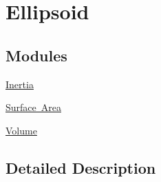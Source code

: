 \hypertarget{group___e_g_x_math-_geometry-3_d-_ellipsoid}{}\section{Ellipsoid}
\label{group___e_g_x_math-_geometry-3_d-_ellipsoid}
\subsection*{Modules}
\begin{DoxyCompactItemize}
\item 
\mbox{\hyperlink{group___e_g_x_math-_geometry-3_d-_ellipsoid-_inertia}{Inertia}}
\item 
\mbox{\hyperlink{group___e_g_x_math-_geometry-3_d-_ellipsoid-_surface_area}{Surface Area}}
\item 
\mbox{\hyperlink{group___e_g_x_math-_geometry-3_d-_ellipsoid-_volume}{Volume}}
\end{DoxyCompactItemize}


\subsection{Detailed Description}

